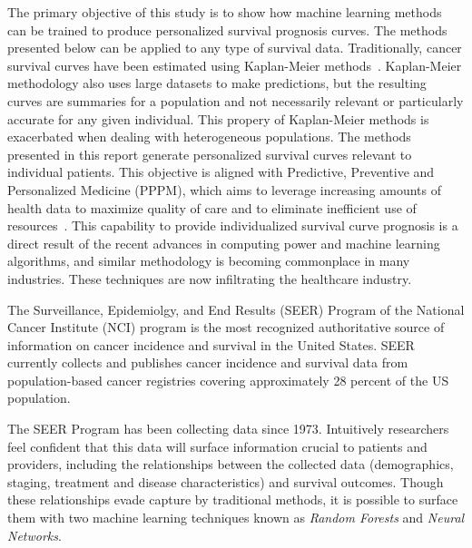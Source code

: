 \documentclass[10pt,letterpaper]{article}
\begin{document}
The primary objective of this study is to show how machine learning methods can be trained to produce personalized survival prognosis curves. The methods presented below can be applied to any type of survival data. Traditionally, cancer survival curves have been estimated using Kaplan-Meier methods~\cite{cam}. Kaplan-Meier methodology also uses large datasets to make predictions, but the resulting curves are summaries for a population and not necessarily relevant or particularly accurate for any given individual. This propery of Kaplan-Meier methods is exacerbated when dealing with heterogeneous populations.  The methods presented in this report generate personalized survival curves relevant to individual patients. This objective is aligned with Predictive, Preventive and Personalized Medicine (PPPM), which aims to leverage increasing amounts of health data to maximize quality of care and to eliminate inefficient use of resources~\cite{VanPoucke2016}.
This capability to provide individualized survival curve prognosis is a direct result of the recent advances in computing power and machine learning algorithms, and similar methodology is becoming commonplace in many industries.
 These techniques are now infiltrating the healthcare industry.
 

The  Surveillance, Epidemiolgy, and End Results (SEER) Program of the National Cancer Institute (NCI)  program is the most recognized authoritative source of information on cancer incidence and survival in the United States. SEER currently collects and publishes cancer incidence and survival data from population-based cancer registries covering approximately 28 percent of the US population.


The SEER Program  has been collecting data since 1973.
Intuitively 
researchers feel confident
 that this data will surface information crucial to patients and providers, including the relationships between the collected data (demographics, staging, treatment and disease characteristics) and survival outcomes.
Though these relationships evade capture by traditional methods, it is possible to surface them with two machine learning techniques known as \emph{Random Forests} and \emph{Neural Networks}.
\end{document}
